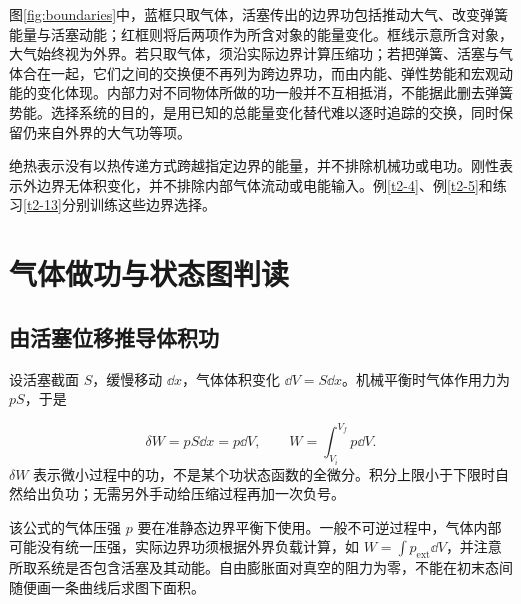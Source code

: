 
图\ref{fig:boundaries}中，蓝框只取气体，活塞传出的边界功包括推动大气、改变弹簧能量与活塞动能；红框则将后两项作为所含对象的能量变化。框线示意所含对象，大气始终视为外界。若只取气体，须沿实际边界计算压缩功；若把弹簧、活塞与气体合在一起，它们之间的交换便不再列为跨边界功，而由内能、弹性势能和宏观动能的变化体现。内部力对不同物体所做的功一般并不互相抵消，不能据此删去弹簧势能。选择系统的目的，是用已知的总能量变化替代难以逐时追踪的交换，同时保留仍来自外界的大气功等项。

绝热表示没有以热传递方式跨越指定边界的能量，并不排除机械功或电功。刚性表示外边界无体积变化，并不排除内部气体流动或电能输入。例\ref{t2-4}、例\ref{t2-5}和练习\ref{t2-13}分别训练这些边界选择。

\section{气体做功与状态图判读}
\subsection{由活塞位移推导体积功}
设活塞截面 $S$，缓慢移动 $\dd x$，气体体积变化 $\dd V=S\dd x$。机械平衡时气体作用力为 $pS$，于是

\[\delta W=pS\dd x=p\dd V,\qquad W=\int_{V_i}^{V_f}p\dd V.
\]
$\delta W$ 表示微小过程中的功，不是某个功状态函数的全微分。积分上限小于下限时自然给出负功；无需另外手动给压缩过程再加一次负号。

该公式的气体压强 $p$ 要在准静态边界平衡下使用。一般不可逆过程中，气体内部可能没有统一压强，实际边界功须根据外界负载计算，如 $W=\int p_{\mathrm{ext}}\dd V$，并注意所取系统是否包含活塞及其动能。自由膨胀面对真空的阻力为零，不能在初末态间随便画一条曲线后求图下面积。


